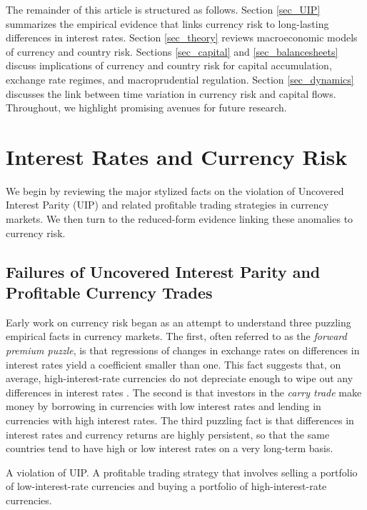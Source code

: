 \documentclass{ar-1col}
\begin{document}
The remainder of this article is structured as follows. Section \ref{sec_UIP} summarizes the empirical evidence that links currency risk to long-lasting differences in interest rates. Section \ref{sec_theory} reviews macroeconomic models of currency and country risk. Sections \ref{sec_capital} and \ref{sec_balancesheets} discuss implications of currency and country risk for capital accumulation, exchange rate regimes, and macroprudential regulation.  Section \ref{sec_dynamics} discusses the link between time variation in currency risk and capital flows. Throughout, we highlight promising avenues for future research.


\section{Interest Rates and Currency Risk \label{sec_UIP}}

We begin by reviewing the major stylized facts on the violation of Uncovered Interest Parity (UIP) and related profitable trading strategies in currency markets. We then turn to the reduced-form evidence linking these anomalies to currency risk. 

\subsection{Failures of
  Uncovered Interest Parity and Profitable Currency Trades }

Early work on currency risk began as an attempt to understand three puzzling empirical facts in currency markets. The first, often referred to as the \textit{forward premium puzzle}, is that regressions of changes in exchange rates on differences in interest rates yield a coefficient smaller than one. This fact suggests that, on average, high-interest-rate currencies do not depreciate enough to wipe out any differences in interest rates \citep{Bilson1981, Fama1984}. The second is that investors in the \textit{carry trade} make money by borrowing in currencies with low interest rates and lending in currencies with high interest rates. The third puzzling fact is that differences in interest rates and currency returns are highly persistent, so that the same countries tend to have high or low interest rates on a very long-term basis.

\begin{marginnote}[]
   {A violation of UIP. A profitable trading strategy that involves selling a portfolio of low-interest-rate currencies and buying a portfolio of high-interest-rate currencies.} 
\end{marginnote}
\end{document}
